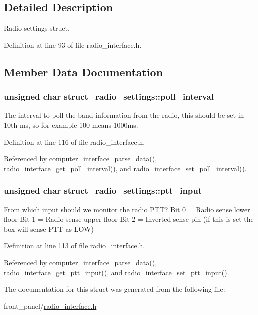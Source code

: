 \subsection{Detailed Description}
Radio settings struct. 

Definition at line 93 of file radio\_\-interface.h.

\subsection{Member Data Documentation}
\hypertarget{structstruct__radio__settings_cc56ddea194970d32f97fa81e99dc1f4}{
\subsubsection[{poll\_\-interval}]{\setlength{\rightskip}{0pt plus 5cm}unsigned char {\bf struct\_\-radio\_\-settings::poll\_\-interval}}}
\label{structstruct__radio__settings_cc56ddea194970d32f97fa81e99dc1f4}


The interval to poll the band information from the radio, this should be set in 10th ms, so for example 100 means 1000ms. 

Definition at line 116 of file radio\_\-interface.h.

Referenced by computer\_\-interface\_\-parse\_\-data(), radio\_\-interface\_\-get\_\-poll\_\-interval(), and radio\_\-interface\_\-set\_\-poll\_\-interval().\hypertarget{structstruct__radio__settings_c8717f0e816966ebd671e937274e28bd}{
\subsubsection[{ptt\_\-input}]{\setlength{\rightskip}{0pt plus 5cm}unsigned char {\bf struct\_\-radio\_\-settings::ptt\_\-input}}}
\label{structstruct__radio__settings_c8717f0e816966ebd671e937274e28bd}


From which input should we monitor the radio PTT? Bit 0 = Radio sense lower floor Bit 1 = Radio sense upper floor Bit 2 = Inverted sense pin (if this is set the box will sense PTT as LOW) 

Definition at line 113 of file radio\_\-interface.h.

Referenced by computer\_\-interface\_\-parse\_\-data(), radio\_\-interface\_\-get\_\-ptt\_\-input(), and radio\_\-interface\_\-set\_\-ptt\_\-input().

The documentation for this struct was generated from the following file:\begin{CompactItemize}
\item 
front\_\-panel/\hyperlink{radio__interface_8h}{radio\_\-interface.h}\end{CompactItemize}
